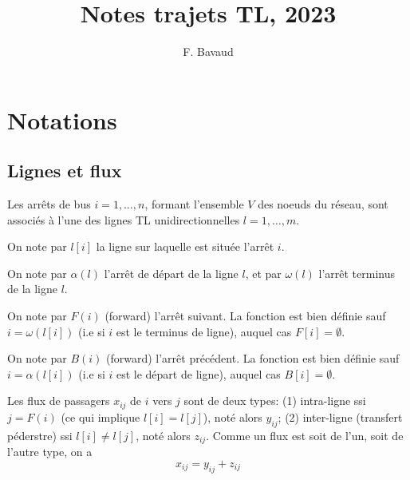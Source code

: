 \documentclass{article}
\title{Notes trajets TL, 2023}
\author{\rm  F. Bavaud
}
\date{}
\theoremstyle{plain}
\begin{document}
\maketitle

 
\section{Notations}
\subsection{Lignes et flux}
Les arrêts de bus $i=1,\ldots,n$, formant l'ensemble $V$ des noeuds du réseau, sont associés à l'une des lignes TL unidirectionnelles $l=1,\ldots,m$. 

On note par $l[i]$  la ligne sur laquelle est située l'arrêt $i$. 

On note par $\alpha(l)$ l'arrêt de départ de la ligne $l$, et par $\omega(l)$ l'arrêt terminus de la ligne $l$. 


 On note par $F(i)$ (forward) l'arrêt suivant. La fonction est bien définie sauf $i=\omega(l[i])$ (i.e si $i$ est le terminus de ligne), auquel cas $F[i]=\emptyset$. 
 
 On note par $B(i)$ (forward) l'arrêt précédent. La fonction est bien définie sauf $i=\alpha(l[i])$ (i.e si $i$ est le départ de ligne),  auquel cas $B[i]=\emptyset$.
 
 
 

Les flux de passagers $x_{ij}$ de $i$ vers  $j$ sont de deux types:  (1) intra-ligne  ssi  $j=F(i)$ (ce qui implique $l[i]=l[j]$), noté alors $y_{ij}$;  (2) inter-ligne (transfert péderstre) ssi $l[i]\neq l[j]$, noté alors $z_{ij}$. Comme un flux est soit de l'un, soit de l'autre type, on a 
\begin{displaymath}
x_{ij}=y_{ij}+z_{ij}
\end{displaymath}

 
\end{document}

